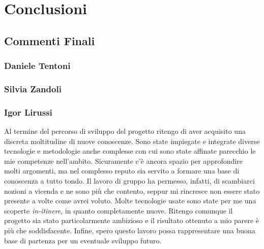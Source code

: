 
\chapter{Conclusioni}
    \section{Commenti Finali}
        \subsection{Daniele Tentoni}
        \subsection{Silvia Zandoli}
        \subsection{Igor Lirussi}
        Al termine del percorso di sviluppo del progetto ritengo di aver acquisito una discreta moltitudine di nuove conoscenze. Sono state impiegate e integrate diverse tecnologie e metodologie anche complesse con cui sono state affinate parecchio le mie competenze nell'ambito. Sicuramente c'è ancora spazio per approfondire molti argomenti, ma nel complesso reputo sia servito a formare una base di conoscenza a tutto tondo. Il lavoro di gruppo ha permesso, infatti, di scambiarci nozioni a vicenda e ne sono più che contento, seppur mi rincresce non essere stato presente a volte come avrei voluto. Molte tecnologie usate sono state per me una scoperte \emph{in-itinere}, in quanto completamente nuove. Ritengo comunque il progetto sia stato particolarmente ambizioso e il risultato ottenuto a mio parere è più che soddisfacente. Infine, spero questo lavoro possa rappresentare una buona base di partenza per un eventuale sviluppo futuro. 
